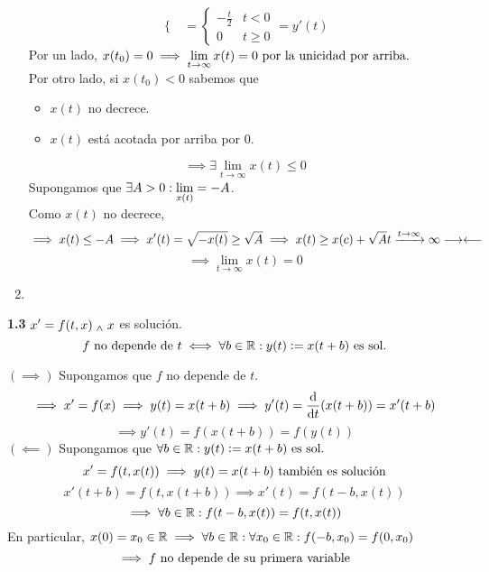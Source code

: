 \begin{enumerate}
\[\begin{cases}
		      \end{cases} = \begin{cases}
			      -\frac{t}{2} & t<0     \\
			      0            & t\geq 0
		      \end{cases} = y'(t)\]
	      Por un lado, $\displaystyle x(t_0)=0 \implies \lim_{t\to \infty}x(t)=0 \text{ por la unicidad por arriba.}$ \\
	      Por otro lado, si $x(t_0)<0$ sabemos que
	      \begin{itemize}
		      \item $x(t)$ no decrece.
		      \item $x(t)$ está acotada por arriba por 0.
	      \end{itemize}
	      \[\implies \exists \lim_{t\to \infty} x(t) \leq 0\]
	      Supongamos que $\displaystyle \exists A > 0 : \lim_{x(t)} = -A$. \\
	      Como $x(t)$ no decrece,
	      \[\displaystyle \implies x(t) \leq -A \implies x'(t) = \sqrt{-x(t)}\geq \sqrt{A} \implies x(t)\geq x(c) + \sqrt{A}t \xrightarrow{t\to \infty} \infty \longrightarrow\longleftarrow\]
	      \[\implies \lim_{t\to \infty} x(t) =0 \]
	\item
\end{enumerate}

\textbf{1.3} $\displaystyle x' = f(t,x) \; _{\wedge} \; x$ es solución.
\[f\text{ no depende de } t \iff \forall b \in \mathbb{R} : y(t)\vcentcolon= x(t+b) \text{ es sol.}\]
\begin{dem}
	$(\implies)$ Supongamos que $f$ no depende de $t$.
	\[\implies x'=f(x) \implies y(t)=x(t+b)\implies y'(t)=\odv{}{t} (x(t+b)) = x'(t+b)\]
	\[\implies y'(t)=f(x(t+b))=f(y(t))\]
	$(\impliedby)$ Supongamos que $\forall b \in \mathbb{R} : y(t)\vcentcolon= x(t+b) \text{ es sol.}$
	\[x'=f(t, x(t)) \implies y(t)=x(t+b) \text{ también es solución}\]
	\[x'(t+b)=f(t, x(t+b)) \implies x'(t) = f(t-b, x(t))\]
	\[\implies \forall b \in \mathbb{R} : f(t-b, x(t))=f(t, x(t))\]
	En particular, $x(0)=x_0 \in \mathbb{R} \implies \forall b \in \mathbb{R} : \forall x_0 \in \mathbb{R} : f(-b,x_0)=f(0,x_0)$
	\[\implies f\text{ no depende de su primera variable}\]
\end{dem}

